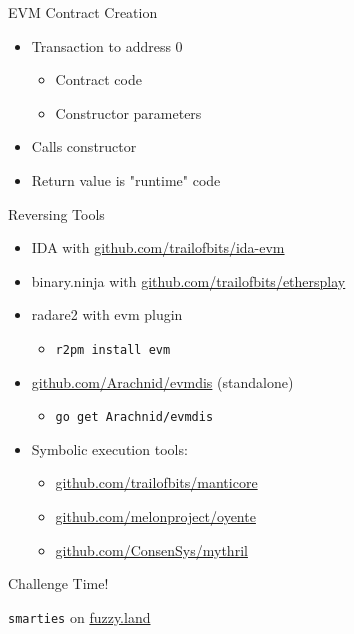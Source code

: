 \begin{frame}
  {EVM Contract Creation}

  \begin{itemize}
    \item Transaction to address $0$
      \begin{itemize}
        \item Contract code
        \item Constructor parameters
      \end{itemize}
    \item Calls constructor
    \item Return value is "runtime" code
  \end{itemize}

\end{frame}

\begin{frame}
  {Reversing Tools}

  \begin{itemize}
    \item IDA with
      \href{https://github.com/trailofbits/ida-evm}{github.com/trailofbits/ida-evm}
    \item binary.ninja with
      \href{https://github.com/trailofbits/ethersplay}{github.com/trailofbits/ethersplay}
    \item radare2 with evm plugin
      \begin{itemize}
        \item \texttt{r2pm install evm}
      \end{itemize}
    \item \href{https://github.com/Arachnid/evmdis/}{github.com/Arachnid/evmdis}
      (standalone)
      \begin{itemize}
        \item \texttt{go get Arachnid/evmdis}
      \end{itemize}
  \end{itemize}

  \begin{itemize}
    \item Symbolic execution tools:
      \begin{itemize}
        \item \href{https://github.com/trailofbits/manticore}{github.com/trailofbits/manticore}
        \item \href{https://github.com/melonproject/oyente}{github.com/melonproject/oyente}
        \item \href{https://github.com/ConsenSys/mythril}{github.com/ConsenSys/mythril}
      \end{itemize}
  \end{itemize}

\end{frame}

\begin{frame}

  \begin{center}
    {\Huge Challenge Time!

  \texttt{smarties} on \href{https://fuzzy.land}{fuzzy.land}}

  \end{center}

\end{frame}
